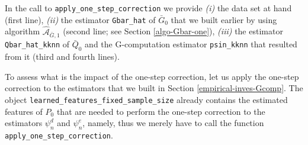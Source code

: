 \documentclass[
  11pt,
  openright,twoside]{book}
\newcommand{\Algo}{\widehat{\mathcal{A}}}
\newcommand{\Gbar}{\bar{G}}
\newcommand{\Qbar}{\bar{Q}}
\theoremstyle{definition}
\theoremstyle{definition}
\theoremstyle{definition}
\theoremstyle{definition}
\theoremstyle{remark}
\begin{document}
In the call to \texttt{apply\_one\_step\_correction} we provide \emph{(i)} the data set at
hand (first line), \emph{(ii)} the estimator \texttt{Gbar\_hat} of \(\Gbar_{0}\) that we
built earlier by using algorithm \(\Algo_{\Gbar,1}\) (second line; see Section
\ref{algo-Gbar-one}), \emph{(iii)} the estimator \texttt{Qbar\_hat\_kknn} of \(\Qbar_{0}\)
and the G-computation estimator \texttt{psin\_kknn} that resulted from it (third and
fourth lines).

To assess what is the impact of the one-step correction, let us apply the
one-step correction to the estimators that we built in Section
\ref{empirical-inves-Gcomp}. The object \texttt{learned\_features\_fixed\_sample\_size}
already contains the estimated features of \(P_{0}\) that are needed to perform
the one-step correction to the estimators \(\psi_{n}^{d}\) and \(\psi_{n}^{e}\),
namely, thus we merely have to call the function \texttt{apply\_one\_step\_correction}.
\end{document}
